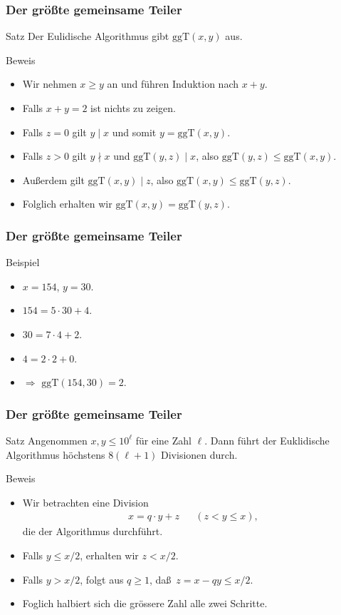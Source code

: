 \documentclass{beamer}
\newcommand{\ggt}{\mathrm{ggT}}
\renewcommand{\oe}{\"o}
\newcommand{\ue}{\"u}
\begin{document}
\begin{frame}\frametitle{Der gr\oe\ss te gemeinsame Teiler}
	\begin{block}{Satz}
		Der Eulidische Algorithmus gibt $\ggt(x,y)$ aus.
	\end{block}
	\begin{block}{Beweis}
		\begin{itemize}
			\item Wir nehmen $x\geq y$ an und f\ue hren Induktion nach $x+y$.
			\item Falls $x+y=2$ ist nichts zu zeigen.
			\item Falls $z=0$ gilt $y\mid x$ und somit $y=\ggt(x,y)$.
			\item Falls $z>0$ gilt $y\nmid x$ und $\ggt(y,z)\mid x$, also $\ggt(y,z)\leq\ggt(x,y)$.
			\item Au\ss erdem gilt $\ggt(x,y)\mid z$, also $\ggt(x,y)\leq\ggt(y,z)$.
			\item Folglich erhalten wir $\ggt(x,y)=\ggt(y,z)$.
		\end{itemize}
	\end{block}
\end{frame}

\begin{frame}\frametitle{Der gr\oe\ss te gemeinsame Teiler}
	\begin{block}{Beispiel}
	\begin{itemize}
	\item $x=154$, $y=30$.
	\item $154=5\cdot 30+4$.
	\item $30=7\cdot 4+2$.
	\item $4=2\cdot2+0$.
	\item $\Rightarrow$ $\ggt(154,30)=2$.
	\end{itemize}
	\end{block}
\end{frame}

\begin{frame}\frametitle{Der gr\oe\ss te gemeinsame Teiler}
	\begin{block}{Satz}
		Angenommen $x,y\leq10^\ell$ f\ue r eine Zahl $\ell$.
		Dann f\ue hrt der Euklidische Algorithmus h\oe chstens $8(\ell+1)$ Divisionen durch.
	\end{block}
	\begin{block}{Beweis}
		\begin{itemize}
			\item Wir betrachten eine Division
				\begin{align*}
					x=q\cdot y+z&&(z<y\leq x),
				\end{align*}
				die der Algorithmus durchf\ue hrt.
			\item Falls $y\leq x/2$, erhalten wir $z<x/2$.
			\item Falls $y>x/2$, folgt aus $q\geq1$, da\ss\ $z=x-qy\leq x/2$.
			\item Foglich halbiert sich die gr\oe ssere Zahl alle zwei Schritte.
		\end{itemize}
	\end{block}
\end{frame}
\end{document}
